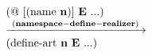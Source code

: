 \newcommand{\lam}[2]{\lambda#1.\,#2}

\begin{flushleft}

$\begin{array}{l}
\begin{array}{l}
  (@~[(\text{name}~\mathbf{n})]~\mathbf{E}~...)\\
  \xrightarrow{\hspace*{0.1cm}\mathbf{(namespace-define-realizer)}\hspace*{0.1cm}}\\
  (\text{define-art}~\mathbf{n}~\mathbf{E}~...)\\
  
\end{array}\\[0.1cm]

\end{array}$

\end{flushleft}

